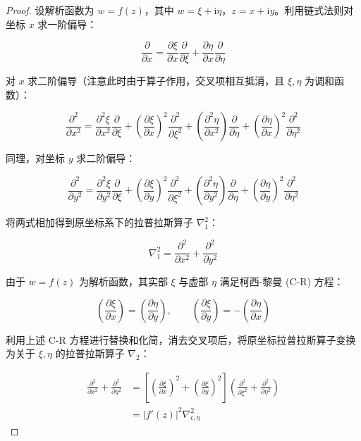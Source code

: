 \begin{proof}
    设解析函数为 \(w = f(z)\)，其中 \(w = \xi + \mathrm{i}\eta\)，\(z = x + \mathrm{i}y\)。利用链式法则对坐标 \(x\) 求一阶偏导：

\begin{equation*}
    \frac{\partial}{\partial x} = \frac{\partial \xi}{\partial x} \frac{\partial}{\partial \xi} + \frac{\partial \eta}{\partial x} \frac{\partial}{\partial \eta}
\end{equation*}

对 \(x\) 求二阶偏导（注意此时由于算子作用，交叉项相互抵消，且 \(\xi, \eta\) 为调和函数）：

\begin{equation*}
    \frac{\partial^2}{\partial x^2} = \frac{\partial^2 \xi}{\partial x^2} \frac{\partial}{\partial \xi} + \left(\frac{\partial \xi}{\partial x}\right)^2 \frac{\partial^2}{\partial \xi^2} + \left(\frac{\partial^2 \eta}{\partial x^2}\right) \frac{\partial}{\partial \eta} + \left(\frac{\partial \eta}{\partial x}\right)^2 \frac{\partial^2}{\partial \eta^2}
\end{equation*}

同理，对坐标 \(y\) 求二阶偏导：

\begin{equation*}
    \frac{\partial^2}{\partial y^2} = \frac{\partial^2 \xi}{\partial y^2} \frac{\partial}{\partial \xi} + \left(\frac{\partial \xi}{\partial y}\right)^2 \frac{\partial^2}{\partial \xi^2} + \left(\frac{\partial^2 \eta}{\partial y^2}\right) \frac{\partial}{\partial \eta} + \left(\frac{\partial \eta}{\partial y}\right)^2 \frac{\partial^2}{\partial \eta^2}
\end{equation*}

将两式相加得到原坐标系下的拉普拉斯算子 \(\nabla_1^2\)：

\begin{equation*}
    \nabla_1^2 = \frac{\partial^2}{\partial x^2} + \frac{\partial^2}{\partial y^2}
\end{equation*}

由于 \(w = f(z)\) 为解析函数，其实部 \(\xi\) 与虚部 \(\eta\) 满足柯西-黎曼 (C-R) 方程：

\begin{equation*}
    \left( \frac{\partial \xi}{\partial x} \right) = \left( \frac{\partial \eta}{\partial y} \right), \qquad \left( \frac{\partial \xi}{\partial y} \right) = - \left( \frac{\partial \eta}{\partial x} \right)
\end{equation*}

利用上述 C-R 方程进行替换和化简，消去交叉项后，将原坐标拉普拉斯算子变换为关于 \(\xi, \eta\) 的拉普拉斯算子 \(\nabla_2\)：

\begin{align*}
    \frac{\partial^2}{\partial x^2} + \frac{\partial^2}{\partial y^2} &= \left[ \left(\frac{\partial \xi}{\partial x}\right)^2 + \left(\frac{\partial \xi}{\partial y}\right)^2 \right] \left( \frac{\partial^2}{\partial \xi^2} + \frac{\partial^2}{\partial \eta^2} \right) \\
    &= |f'(z)|^2 \nabla_{\epsilon, \eta}^2
\end{align*}
\end{proof}

